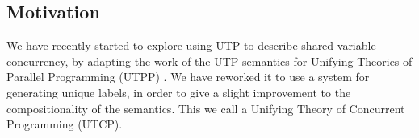 \subsection{Motivation}\label{ssec:motivate}


We have recently started to explore using UTP
to describe shared-variable concurrency,
by adapting the work of the  UTP semantics for Unifying Theories
of Parallel Programming (UTPP) \cite{DBLP:conf/icfem/WoodcockH02}.
We have reworked it to use a system for generating unique labels,
in order to give a slight improvement to the compositionality
of the semantics.
This we call a Unifying Theory of Concurrent Programming (UTCP)\cite{conf/tase/BMN16}.
